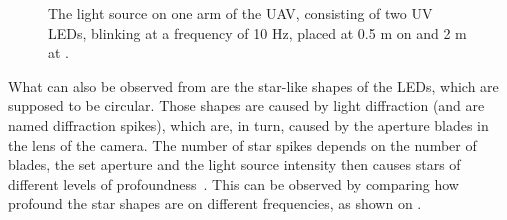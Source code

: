 \begin{figure}[H]
	\centering
	\caption{
  The light source on one arm of the UAV, consisting of two UV LEDs, blinking at a frequency of 10 Hz,
  placed at 0.5 m on  and 2 m at .
  }
	\label{fig:leds}
\end{figure}
What can also be observed from  are the star-like shapes of the LEDs, which are supposed to be circular.
Those shapes are caused by light diffraction (and are named diffraction spikes), which are, in turn, caused by the aperture
blades in the lens of the camera. The number
of star spikes depends on the number of blades, the set aperture and the light source intensity then causes stars of different
levels of profoundness~\cite{lendermann2018computational}. This can be observed by comparing how profound the star shapes are on different
frequencies, as shown on .

